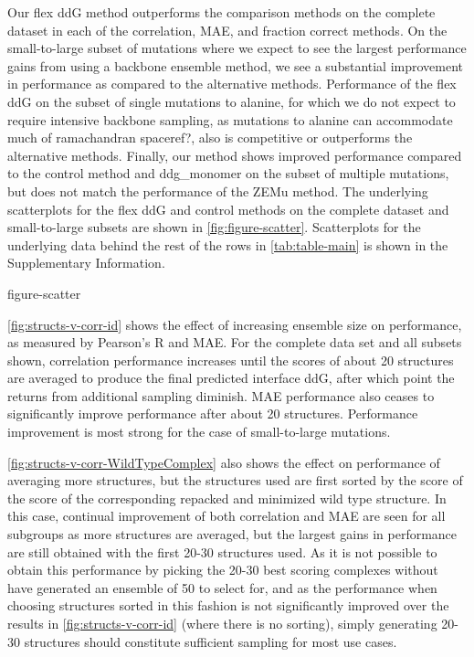 Our flex ddG method outperforms the comparison methods on the complete dataset in each of the correlation, MAE, and fraction correct methods. On the small-to-large subset of mutations where we expect to see the largest performance gains from using a backbone ensemble method, we see a substantial improvement in performance as compared to the alternative methods. Performance of the flex ddG on the subset of single mutations to alanine, for which we do not expect to require intensive backbone sampling, as mutations to alanine can accommodate much of ramachandran space{ref?}, also is competitive or outperforms the alternative methods. Finally, our method shows improved performance compared to the control method and ddg\_monomer on the subset of multiple mutations, but does not match the performance of the ZEMu method. The underlying scatterplots for the flex ddG and control methods on the complete dataset and small-to-large subsets are shown in \cref{fig:figure-scatter}. Scatterplots for the underlying data behind the rest of the rows in \cref{tab:table-main} is shown in the Supplementary Information.

{figure-scatter}

\cref{fig:structs-v-corr-id} shows the effect of increasing ensemble size on performance, as measured by Pearson’s R and MAE. For the complete data set and all subsets shown, correlation performance increases until the scores of about 20 structures are averaged to produce the final predicted interface ddG, after which point the returns from additional sampling diminish. MAE performance also ceases to significantly improve performance after about 20 structures. Performance improvement is most strong for the case of small-to-large mutations.

\cref{fig:structs-v-corr-WildTypeComplex} also shows the effect on performance of averaging more structures, but the structures used are first sorted by the score of the score of the corresponding repacked and minimized wild type structure. In this case, continual improvement of both correlation and MAE are seen for all subgroups as more structures are averaged, but the largest gains in performance are still obtained with the first 20-30 structures used. As it is not possible to obtain this performance by picking the 20-30 best scoring complexes without have generated an ensemble of 50 to select for, and as the performance when choosing structures sorted in this fashion is not significantly improved over the results in \cref{fig:structs-v-corr-id} (where there is no sorting), simply generating 20-30 structures should constitute sufficient sampling for most use cases.

